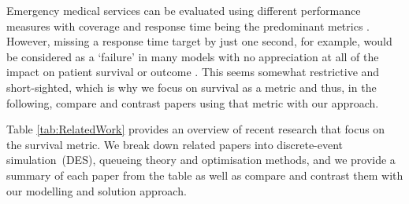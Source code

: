 \documentclass[preprint,12pt]{elsarticle}
\begin{document}
Emergency medical services can be evaluated using different performance measures
with coverage and response time being the predominant metrics
\cite{Mclay2010evaluating}. However, missing a response time target by just one
second, for example, would be considered as a `failure' in many models with no
appreciation at all of the impact on patient survival or outcome
\cite{Mclay2010evaluating}. This seems somewhat restrictive and short-sighted,
which is why we focus on survival as a metric and thus, in the following,
compare and contrast papers using that metric with our approach.

Table \ref{tab:RelatedWork} provides an overview of recent research that focus
on the survival metric. We break down related papers into discrete-event
simulation~(DES), queueing theory and optimisation methods, and we provide a
summary of each paper from the table as well as compare and contrast them with
our modelling and solution approach.

\begin{table}[htbp] \centering \small {} \end{table}

\FloatBarrier


\end{document}
